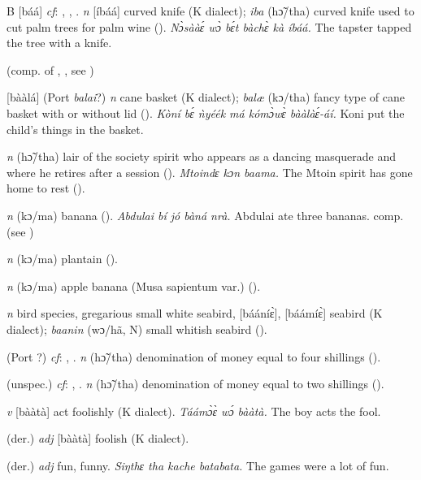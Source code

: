 \begin{letter}{B}
 [báá] \textit{cf}: , , . \textit{n} [íbáá] curved knife (K dialect); \textit{iba} (hɔ̃/tha) curved knife used to cut palm trees for palm wine (\citealt{Pichl1967}). \textit{Nɔ̀sààɛ́ wɔ̀ bɛ́t bàchɛ̀ kà íbáá.} The tapster tapped the tree with a knife.

 (comp. of , , see ) 

 [bààlá] (Port \textit{balai}?) \textit{n} cane basket (K dialect); \textit{balæ} (kɔ/tha) fancy type of cane basket with or without lid (\citealt{Pichl1967}). \textit{Kòní bɛ́ ǹyéék má kómɔ̀wɛ̀ bààlàɛ́-áí.} Koni put the child's things in the basket.

 \textit{n} (hɔ̃/tha) lair of the society spirit who appears as a dancing masquerade and where he retires after a session (\citealt{Pichl1967}). \textit{Mtoindɛ kɔn baama.} The Mtoin spirit has gone home to rest (\citealt{Pichl1967}). 

 \textit{n} (kɔ/ma) banana (\citealt{Pichl1967}). \textit{Abdulai bí jó bàná nrà.} Abdulai ate three bananas. comp.  (see ) 

 \textit{n} (kɔ/ma) plantain (\citealt{Pichl1967}). 

 \textit{n} (kɔ/ma) apple banana (Musa sapientum var.) (\citealt{Pichl1967}). 

 \textit{n} bird species, gregarious small white seabird, [bááníɛ̀], [báámíɛ̀] seabird (K dialect); \textit{baanin} (wɔ/hã, N) small whitish seabird (\citealt{Pichl1967}).

 (Port ?) \textit{cf}: , . \textit{n} (hɔ̃/tha) denomination of money equal to four shillings (\citealt{Pichl1967}).

 (unspec.) \textit{cf}: , . \textit{n} (hɔ̃/tha) denomination of money equal to two shillings (\citealt{Pichl1967}).

 \textit{v} [bààtà] act foolishly (K dialect). \textit{Táámɔ̀ɛ̀ wɔ́ bààtà.} The boy acts the fool.

 (der.) \textit{adj} [bààtà] foolish (K dialect). 

 (der.) \textit{adj} fun, funny. \textit{Siŋthɛ tha kache batabata.} The games were a lot of fun.


\end{letter}
